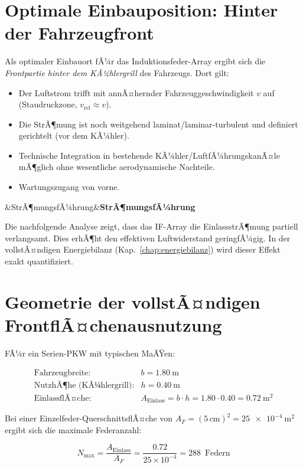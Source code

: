 ﻿\documentclass[12pt, a4paper]{report}
\newenvironment{hinweis}[1][]{%
  \begin{hinweisframe}\sloppy%
  \ifx&#1&\else\textbf{#1}\par\smallskip\fi}{\end{hinweisframe}}
\theoremstyle{definition}
\theoremstyle{remark}
\newcommand{\Aeinlass}{A_{\text{Einlass}}}
\begin{document}
\section{Optimale Einbauposition: Hinter der Fahrzeugfront}

Als optimaler Einbauort fÃ¼r das Induktionsfeder-Array ergibt sich die
\emph{Frontpartie hinter dem KÃ¼hlergrill} des Fahrzeugs. Dort gilt:

\begin{itemize}
  \item Der Luftstrom trifft mit annÃ¤hernder Fahrzeuggeschwindigkeit $v$ auf
        (Staudruckzone, $v_{\text{rel}} \approx v$).
  \item Die StrÃ¶mung ist noch weitgehend laminat/laminar-turbulent und
        definiert gerichtelt (vor dem KÃ¼hler).
  \item Technische Integration in bestehende KÃ¼hler/LuftfÃ¼hrungskanÃ¤le
        mÃ¶glich ohne wesentliche aerodynamische Nachteile.
  \item Wartungszugang von vorne.
\end{itemize}

\begin{hinweis}[StrÃ¶mungsfÃ¼hrung]
  Die nachfolgende Analyse zeigt, dass das IF-Array die EinlassstrÃ¶mung
  partiell verlangsamt. Dies erhÃ¶ht den effektiven Luftwiderstand geringfÃ¼gig.
  In der vollstÃ¤ndigen Energiebilanz (Kap.~\ref{chap:energiebilanz}) wird
  dieser Effekt exakt quantifiziert.
\end{hinweis}

\section{Geometrie der vollstÃ¤ndigen FrontflÃ¤chenausnutzung}

FÃ¼r ein Serien-PKW mit typischen MaÃŸen:

\begin{align}
  \text{Fahrzeugbreite: } & b = \SI{1.80}{\metre} \\
  \text{NutzhÃ¶he (KÃ¼hlergrill):} & h = \SI{0.40}{\metre} \\
  \text{EinlassflÃ¤che:} & \Aeinlass = b \cdot h = 1.80 \cdot 0.40 = \SI{0.72}{\metre\squared}
  \label{eq:a_einlass}
\end{align}

Bei einer Einzelfeder-QuerschnittsflÃ¤che von $A_F = (5\,\text{cm})^2 = \SI{25e-4}{\metre\squared}$
ergibt sich die maximale Federanzahl:

\begin{equation}
  N_{\text{max}} = \frac{\Aeinlass}{A_F} = \frac{0.72}{25 \times 10^{-4}} = 288\,\text{ Federn}
  \label{eq:n_federn}
\end{equation}
\end{document}
